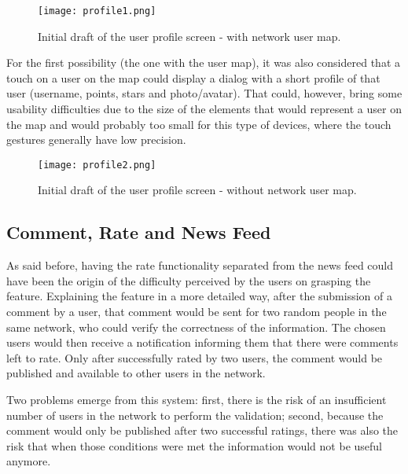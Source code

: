 \begin{figure}[h!]
  \begin{center}
    \leavevmode
    \texttt{[image: profile1.png]}
    \caption{Initial draft of the user profile screen - with network user map.}
    \label{fig:profile1}
  \end{center}
\end{figure}

For the first possibility (the one with the user map), it was also considered that a touch on a user on the map could display a dialog with a short profile of that user (username, points, stars and photo/avatar). That could, however, bring some usability difficulties due to the size of the elements that would represent a user on the map and would probably too small for this type of devices, where the touch gestures generally have low precision.

\begin{figure}[h!]
  \begin{center}
    \leavevmode
    \texttt{[image: profile2.png]}
    \caption{Initial draft of the user profile screen - without network user map.}
    \label{fig:profile2}
  \end{center}
\end{figure}

\subsection{Comment, Rate and News Feed}\label{rateinitial}

As said before, having the rate functionality separated from the news feed could have been the origin of the difficulty perceived by the users on grasping the feature. Explaining the feature in a more detailed way, after the submission of a comment by a user, that comment would be sent for two random people in the same network, who could verify the correctness of the information. 
The chosen users would then receive a notification informing them that there were comments left to rate. Only after successfully rated by two users, the comment would be published and available to other users in the network.

Two problems emerge from this system: first, there is the risk of an insufficient number of users in the network to perform the validation; second, because the comment would only be published after two successful ratings, there was also the risk that when those conditions were met the information would not be useful anymore.

